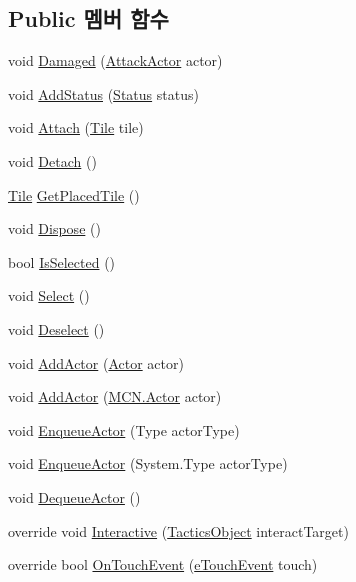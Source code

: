 \subsection*{Public 멤버 함수}
\begin{DoxyCompactItemize}
\item 
void \hyperlink{class_combat_object_afeda914f613cec31214bf41233d5cb1e}{Damaged} (\hyperlink{class_attack_actor}{Attack\+Actor} actor)
\item 
void \hyperlink{class_combat_object_a9be860004106d19e5e020d0855d96886}{Add\+Status} (\hyperlink{struct_status}{Status} status)
\item 
void \hyperlink{class_placeable_object_a3176ec3d5d26b2a83cdc58b01e630aa1}{Attach} (\hyperlink{class_tile}{Tile} tile)
\item 
void \hyperlink{class_placeable_object_aef2018b58bf7c8c0fab5aaf3d9a154d4}{Detach} ()
\item 
\hyperlink{class_tile}{Tile} \hyperlink{class_placeable_object_ab44a9b122632ac3cf0babb5040e8a201}{Get\+Placed\+Tile} ()
\item 
void \hyperlink{class_placeable_object_a8bd49b7db556556502a0518fc833be48}{Dispose} ()
\item 
bool \hyperlink{class_placeable_object_a71fd42914caa0dc6229fe6a5ffe09b99}{Is\+Selected} ()
\item 
void \hyperlink{class_placeable_object_a019818f3f6c6eb715fed163efa921f5a}{Select} ()
\item 
void \hyperlink{class_placeable_object_a0c1248b1f9981ddbf68e6f70a6498f3d}{Deselect} ()
\item 
void \hyperlink{class_placeable_object_a4f7ac210f2729a35d88a22d7f286ade5}{Add\+Actor} (\hyperlink{class_m_c_n_1_1_actor}{Actor} actor)
\item 
void \hyperlink{interface_m_c_n_1_1_i_actor_queue_a4ff84085475a9689d242fea2861d6f1e}{Add\+Actor} (\hyperlink{class_m_c_n_1_1_actor}{M\+C\+N.\+Actor} actor)
\item 
void \hyperlink{class_placeable_object_ad21b0a166f06cf406fd2ffdeee04eb3b}{Enqueue\+Actor} (Type actor\+Type)
\item 
void \hyperlink{interface_m_c_n_1_1_i_actor_queue_a363cf9df4d42c417cab5b14952f95ebd}{Enqueue\+Actor} (System.\+Type actor\+Type)
\item 
void \hyperlink{class_placeable_object_a4df6b98c3e629a1deedb8c8b740e9b04}{Dequeue\+Actor} ()
\item 
override void \hyperlink{class_placeable_object_a167a3ebbac7456ea823c0b51ee37046d}{Interactive} (\hyperlink{class_tactics_object}{Tactics\+Object} interact\+Target)
\item 
override bool \hyperlink{class_placeable_object_a2807603db9cda7bcec8c9d83aa08e44b}{On\+Touch\+Event} (\hyperlink{_touch_manager_8cs_ae33e321a424fe84ba8b2fdb81ad40a68}{e\+Touch\+Event} touch)
\end{DoxyCompactItemize}
